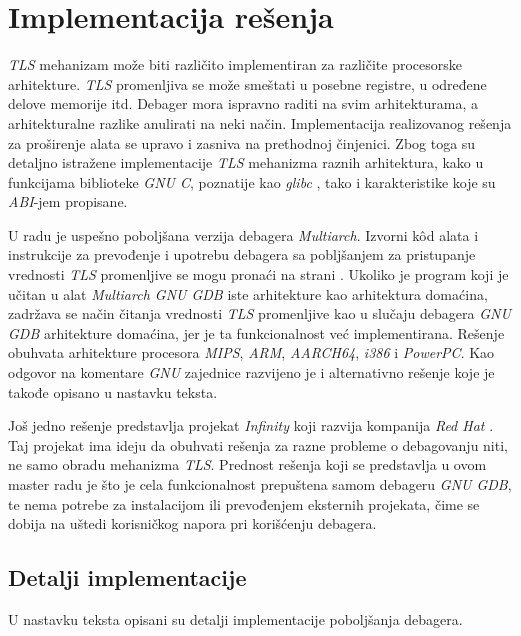 \documentclass[12pt,oneside]{memoir}
\begin{document}
\chapter{Implementacija rešenja}
\label{chp:Implementacija}

\emph{TLS} mehanizam može biti različito implementiran za različite procesorske arhitekture. \emph{TLS} promenljiva se može smeštati u posebne registre, u određene delove memorije itd. Debager mora ispravno raditi na svim arhitekturama, a arhitekturalne razlike anulirati na neki način. Implementacija realizovanog rešenja za proširenje alata se upravo i zasniva na prethodnoj činjenici. Zbog toga su detaljno istražene implementacije \emph{TLS} mehanizma raznih arhitektura, kako u funkcijama biblioteke \emph{GNU C}, poznatije kao \emph{glibc} \cite{GLIBC}, tako i karakteristike koje su \emph{ABI}-jem propisane.

U radu je uspešno poboljšana verzija debagera \emph{Multiarch}. Izvorni k\^{o}d alata i instrukcije za prevođenje i upotrebu debagera sa pobljšanjem za pristupanje vrednosti \emph{TLS} promenljive se mogu pronaći na strani \cite{GITMOJ}. Ukoliko je program koji je učitan u alat \emph{Multiarch GNU GDB} iste arhitekture kao arhitektura domaćina, zadržava se način čitanja vrednosti \emph{TLS} promenljive kao u slučaju debagera \emph{GNU GDB} arhitekture domaćina, jer je ta funkcionalnost već implementirana. Rešenje obuhvata arhitekture procesora \emph{MIPS}, \emph{ARM}, \emph{AARCH64}, \emph{i386} i \emph{PowerPC}. Kao odgovor na komentare \emph{GNU} zajednice razvijeno je i alternativno rešenje koje je takođe opisano u nastavku teksta.

Još jedno rešenje predstavlja projekat \emph{Infinity} \cite{Infinity} koji razvija kompanija \emph{Red Hat} \cite{REDHAT}. Taj projekat ima ideju da obuhvati rešenja za razne probleme o debagovanju niti, ne samo obradu mehanizma \emph{TLS}. Prednost rešenja koji se predstavlja u ovom master radu je što je cela funkcionalnost prepuštena samom debageru \emph{GNU GDB}, te nema potrebe za instalacijom ili prevođenjem eksternih projekata, čime se dobija na uštedi korisničkog napora pri korišćenju debagera.

\section{Detalji implementacije}

U nastavku teksta opisani su detalji implementacije poboljšanja debagera.
\end{document}
